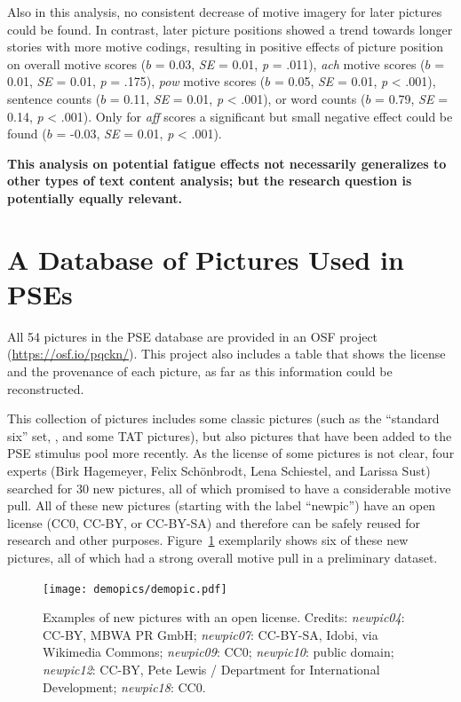\documentclass[man,a4paper,mask]{apa6}\usepackage[]{graphicx}\usepackage[]{color}
\newcommand{\added}[1]{\textcolor{colour_added}{\bf{#1}}}
\begin{document}
Also in this analysis, no consistent decrease of motive imagery for later pictures could be found. In contrast, later picture positions showed a trend towards longer stories with more motive codings, resulting in positive effects of picture position on overall motive scores ($b$ = 0.03, \emph{SE} = 0.01, \emph{p} = .011), \emph{ach} motive scores ($b$ = 0.01, \emph{SE} = 0.01, \emph{p} = .175), \emph{pow} motive scores ($b$ = 0.05, \emph{SE} = 0.01, \emph{p} < .001), sentence counts ($b$ = 0.11, \emph{SE} = 0.01, \emph{p} < .001), or word counts ($b$ = 0.79, \emph{SE} = 0.14, \emph{p} < .001). Only for \emph{aff} scores a significant but small negative effect could be found ($b$ = -0.03, \emph{SE} = 0.01, \emph{p} < .001).

\added{This analysis on potential fatigue effects not necessarily generalizes to other types of text content analysis; but the research question is potentially equally relevant.}

\section{A Database of Pictures Used in PSEs}

All 54 pictures in the PSE database are provided in an OSF project (\url{https://osf.io/pqckn/}). This project also includes a table that shows the license and the provenance of each picture, as far as this information could be reconstructed. 

This collection of pictures includes some classic pictures (such as the ``standard six'' set, , and some TAT pictures), but also pictures that have been added to the PSE stimulus pool more recently. As the license of some pictures is not clear, four experts (Birk Hagemeyer, Felix Schönbrodt, Lena Schiestel, and Larissa Sust) searched for 30 new pictures, all of which promised to have a considerable motive pull. All of these new pictures (starting with the label ``newpic'') have an open license (CC0, CC-BY, or CC-BY-SA) and therefore can be safely reused for research and other purposes. Figure~\ref{fig:demopic} exemplarily shows six of these new pictures, all of which had a strong overall motive pull in a preliminary dataset.


\begin{figure}[htp]
  \begin{center}
	\texttt{[image: demopics/demopic.pdf]}
  \end{center}
  \caption{Examples of new pictures with an open license. Credits: \emph{newpic04}: CC-BY, MBWA PR GmbH; \emph{newpic07}: CC-BY-SA, Idobi, via Wikimedia Commons; \emph{newpic09}: CC0; \emph{newpic10}: public domain; \emph{newpic12}: CC-BY, Pete Lewis / Department for International Development; \emph{newpic18}: CC0.}
  \label{fig:demopic}
\end{figure}
\end{document}
